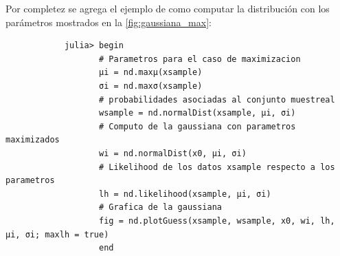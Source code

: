 \begin{enumerate}
\begin{solution}
        Por completez se agrega el ejemplo de como computar la distribución con los parámetros mostrados en la \cref{fig:gaussiana_max}:
        \begin{verbatim}
            julia> begin
                   # Parametros para el caso de maximizacion
                   μi = nd.maxμ(xsample)
                   σi = nd.maxσ(xsample)
                   # probabilidades asociadas al conjunto muestreal
                   wsample = nd.normalDist(xsample, μi, σi)
                   # Computo de la gaussiana con parametros maximizados
                   wi = nd.normalDist(x0, μi, σi)
                   # Likelihood de los datos xsample respecto a los parametros
                   lh = nd.likelihood(xsample, μi, σi)
                   # Grafica de la gaussiana
                   fig = nd.plotGuess(xsample, wsample, x0, wi, lh, μi, σi; maxlh = true)
                   end
        \end{verbatim}


\end{solution}
\end{enumerate}
